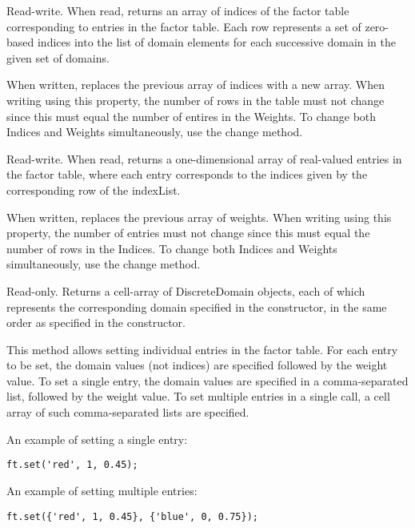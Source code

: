 \fi



Read-write.  When read, returns an array of indices of the factor table corresponding to entries in the factor table.  Each row represents a set of zero-based indices into the list of domain elements for each successive domain in the given set of domains.

When written, replaces the previous array of indices with a new array.  When writing using this property, the number of rows in the table must not change since this must equal the number of entires in the Weights.  To change both Indices and Weights simultaneously, use the change method.


Read-write.  When read, returns a one-dimensional array of real-valued entries in the factor table, where each entry corresponds to the indices given by the corresponding row of the indexList.

When written, replaces the previous array of weights.  When writing using this property, the number of entries must not change since this must equal the number of rows in the Indices.  To change both Indices and Weights simultaneously, use the change method.


Read-only.  Returns a cell-array of DiscreteDomain objects, each of which represents the corresponding domain specified in the constructor, in the same order as specified in the constructor.



\label{sec:FactorTable.set}


\ifmatlab

This method allows setting individual entries in the factor table.  For each entry to be set, the domain values (not indices) are specified followed by the weight value.  To set a single entry, the domain values are specified in a comma-separated list, followed by the weight value.  To set multiple entries in a single call, a cell array of such comma-separated lists are specified.

An example of setting a single entry:
\begin{lstlisting}
ft.set('red', 1, 0.45);
\end{lstlisting}

An example of setting multiple entries:
\begin{lstlisting}
ft.set({'red', 1, 0.45}, {'blue', 0, 0.75});
\end{lstlisting}
\fi

